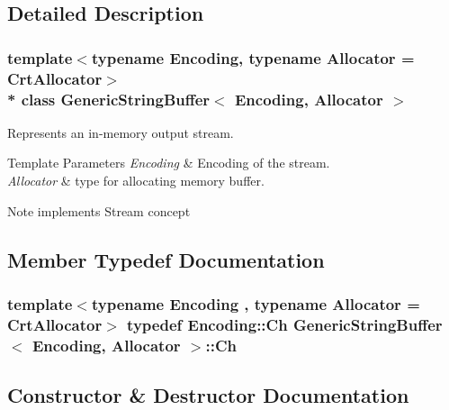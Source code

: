 \subsection{Detailed Description}
\subsubsection*{template$<$typename Encoding, typename Allocator = Crt\+Allocator$>$\\*
class Generic\+String\+Buffer$<$ Encoding, Allocator $>$}

Represents an in-\/memory output stream. 


\begin{DoxyTemplParams}{Template Parameters}
{\em Encoding} & Encoding of the stream. \\
\hline
{\em Allocator} & type for allocating memory buffer. \\
\hline
\end{DoxyTemplParams}
\begin{DoxyNote}{Note}
implements Stream concept 
\end{DoxyNote}


\subsection{Member Typedef Documentation}
\subsubsection[{\texorpdfstring{Ch}{Ch}}]{\setlength{\rightskip}{0pt plus 5cm}template$<$typename Encoding , typename Allocator  = Crt\+Allocator$>$ typedef Encoding\+::\+Ch {\bf Generic\+String\+Buffer}$<$ Encoding, Allocator $>$\+::{\bf Ch}}\hypertarget{classGenericStringBuffer_a735b75db076ffe86d0d294be49655d46}{}\label{classGenericStringBuffer_a735b75db076ffe86d0d294be49655d46}


\subsection{Constructor \& Destructor Documentation}
